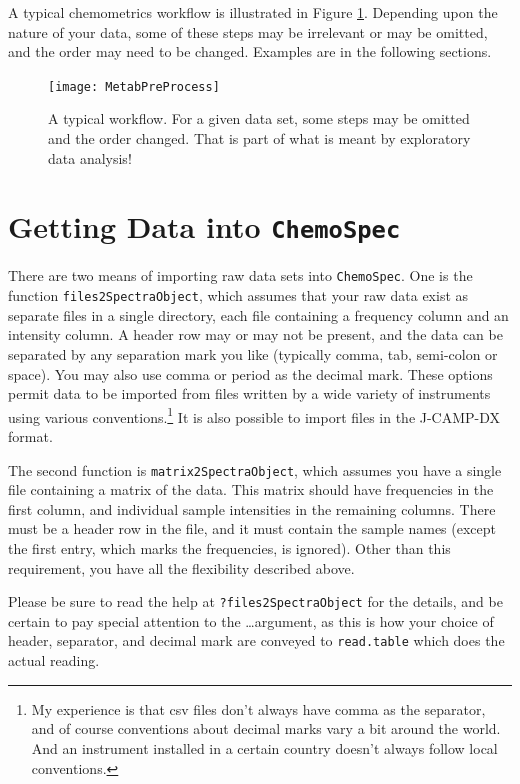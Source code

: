 \documentclass[letter,10pt,twocolumn,twoside,printwatermark=false]{pinp}
\begin{document}
A typical chemometrics workflow is illustrated in Figure \ref{WF}.
Depending upon the nature of your data, some of these steps may be
irrelevant or may be omitted, and the order may need to be changed.
Examples are in the following sections.

\begin{figure}
\texttt{[image: MetabPreProcess]}
\caption{\label{WF}A typical workflow.  For a given data set, some steps may be omitted and the order changed.  That is part of what is meant by exploratory data analysis!}
\end{figure}

\hypertarget{getting-data-into}{%
\section{\texorpdfstring{Getting Data into
\texttt{ChemoSpec}}{Getting Data into }}\label{getting-data-into}}

There are two means of importing raw data sets into \texttt{ChemoSpec}.
One is the function \texttt{files2SpectraObject}, which assumes that
your raw data exist as separate files in a single directory, each file
containing a frequency column and an intensity column. A header row may
or may not be present, and the data can be separated by any separation
mark you like (typically comma, tab, semi-colon or space). You may also
use comma or period as the decimal mark. These options permit data to be
imported from files written by a wide variety of instruments using
various
conventions.\footnote{My experience is that csv files don't always have comma as the separator, and of course conventions about decimal marks vary a bit around the world.  And an instrument installed in a certain country doesn't always follow local conventions.}
It is also possible to import files in the J-CAMP-DX format.

The second function is \texttt{matrix2SpectraObject}, which assumes you
have a single file containing a matrix of the data. This matrix should
have frequencies in the first column, and individual sample intensities
in the remaining columns. There must be a header row in the file, and it
must contain the sample names (except the first entry, which marks the
frequencies, is ignored). Other than this requirement, you have all the
flexibility described above.

Please be sure to read the help at \texttt{?files2SpectraObject} for the
details, and be certain to pay special attention to the \ldots argument,
as this is how your choice of header, separator, and decimal mark are
conveyed to \texttt{read.table} which does the actual reading.
\end{document}
